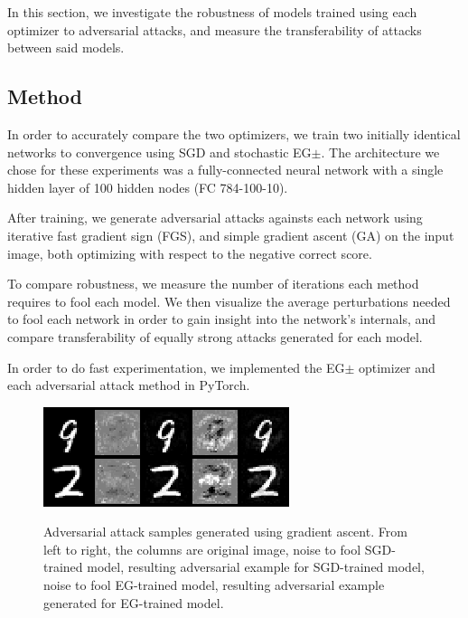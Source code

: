 \documentclass{asaproc}
\begin{document}
In this section, we investigate the robustness of models trained using each optimizer to adversarial attacks, and measure the transferability of attacks between said models.

\subsection*{Method}

In order to accurately compare the two optimizers, we train two initially identical networks to convergence using SGD and stochastic EG$\pm$. The architecture we chose for these experiments was a fully-connected neural network with a single hidden layer of 100 hidden nodes (FC 784-100-10).

After training, we generate adversarial attacks againsts each network using iterative fast gradient sign (FGS), and simple gradient ascent (GA) on the input image, both optimizing with respect to the negative correct score.

To compare robustness, we measure the number of iterations each method requires to fool each model. We then visualize the average perturbations needed to fool each network in order to gain insight into the network's internals, and compare transferability of equally strong attacks generated for each model.

In order to do fast experimentation, we implemented the EG$\pm$ optimizer and each adversarial attack method in PyTorch.

\begin{figure}
	\centering
	\caption{\enspace Adversarial attack samples generated using gradient ascent. From left to right, the columns are original image, noise to fool SGD-trained model, resulting adversarial example for SGD-trained model, noise to fool EG-trained model, resulting adversarial example generated for EG-trained model.}
	\includegraphics[width=\linewidth]{mnist_attacks.png}
	\label{fig6}
\end{figure}
\end{document}
